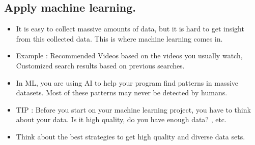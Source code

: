 \documentclass[11pt, oneside]{article}   	%
\begin{document}
\subsection{Apply machine learning.}
\begin{itemize}
\item It is easy to collect massive amounts of data, but it is hard to get insight from this collected data. This is where machine learning comes in.
\item Example : Recommended Videos based on the videos you usually watch, Customized search results based on previous searches.
\item In ML, you are using AI to help your program find patterns in massive datasets. Most of these patterns may never be detected by humans. 
\item TIP : Before you start on your machine learning project, you have to think about your data. Is it high quality, do you have enough data? , etc.
\item Think about the best strategies to get high quality and diverse data sets.
\end{itemize}
\end{document}
